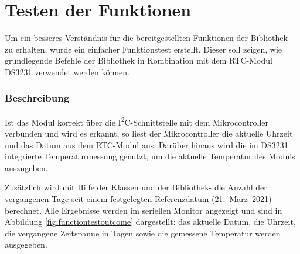 



\section{Testen der Funktionen}
\label{sec:functiontest}

Um ein besseres Verständnis für die bereitgestellten Funktionen der Bibliothek- zu erhalten,
wurde ein einfacher Funktionstest erstellt. 
Dieser soll zeigen, wie grundlegende Befehle der Bibliothek in Kombination mit dem RTC-Modul DS3231 
verwendet werden können.

\subsubsection*{Beschreibung}

Ist das Modul korrekt über die I\textsuperscript{2}C-Schnittstelle mit dem Mikrocontroller verbunden 
und wird es erkannt, so liest der Mikrocontroller die aktuelle Uhrzeit und das Datum aus dem RTC-Modul aus.
Darüber hinaus wird die im DS3231 integrierte Temperaturmessung genutzt, 
um die aktuelle Temperatur des Moduls auszugeben.

Zusätzlich wird mit Hilfe der Klassen  und  
der Bibliothek- die Anzahl der vergangenen Tage seit einem festgelegten Referenzdatum 
(21.~März~2021) berechnet.
Alle Ergebnisse werden im seriellen Monitor angezeigt und sind in Abbildung \ref{fig:functiontestoutcome} dargestellt: 
das aktuelle Datum, die Uhrzeit, die vergangene Zeitspanne in Tagen sowie die gemessene Temperatur werden ausgegeben.

